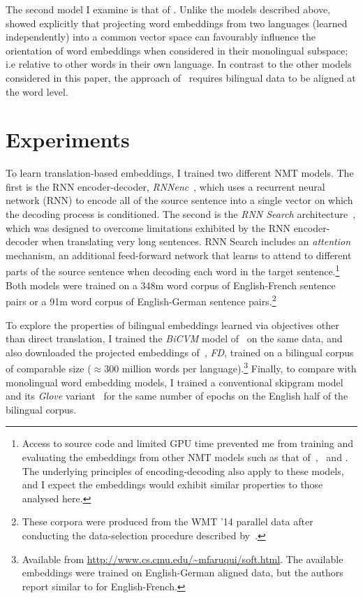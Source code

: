 The second model I examine is that of \cite{faruqui2014improving}. Unlike the models described above, \cite{faruqui2014improving} showed explicitly that projecting word embeddings from two languages (learned independently) into a common vector space can favourably influence the orientation of word embeddings when considered in their monolingual subspace; i.e relative to other words in their own language. In contrast to the other models considered in this paper, the approach of~\cite{faruqui2014improving} requires bilingual data to be aligned at the word level.

\section{Experiments}

To learn translation-based embeddings, I trained two different NMT models. The first is the RNN encoder-decoder, \emph{RNNenc}~\citep{Cho2014}, which uses a recurrent neural network (RNN) to encode all of the source sentence into a single vector on which the decoding process is conditioned. The second is the \emph{RNN Search} architecture~\citep{bahdanau2014neural}, which was designed to overcome limitations exhibited by the RNN encoder-decoder when translating very long sentences. RNN Search includes an \emph{attention} mechanism, an additional feed-forward network that learns to attend to different parts of the source sentence when decoding each word in the target sentence.\footnote{Access to source code and limited GPU time prevented me from training and evaluating the embeddings from other NMT models such as that of~\cite{kalchbrenner13emnlp},~\cite{devlin2014fast} and \cite{Sutskever2014sequence}. The underlying principles of encoding-decoding also apply to these models, and I expect the embeddings would exhibit similar properties to those analysed here.} Both models were trained on a 348m word corpus of English-French sentence pairs or a 91m word corpus of English-German sentence pairs.\footnote{These corpora were produced from the WMT ’14 parallel data after conducting the data-selection procedure described by~\cite{Cho2014}. } 

To explore the properties of bilingual embeddings learned via objectives other than direct translation, I trained the \emph{BiCVM} model of~\cite{Hermann:2014:ICLR} on the same data, and also downloaded the projected embeddings of~\cite{faruqui2014improving}, \emph{FD}, trained on a bilingual corpus of comparable size (\(\approx 300\) million words per language).\footnote{Available from \url{http://www.cs.cmu.edu/~mfaruqui/soft.html}. The available embeddings were trained on English-German aligned data, but the authors report similar to for English-French.} Finally, to compare with monolingual word embedding models, I trained a conventional skipgram model~\citep{mikolov2013distributed} and its \emph{Glove} variant~\citep{Pennington2014} for the same number of epochs on the English half of the bilingual corpus. 


